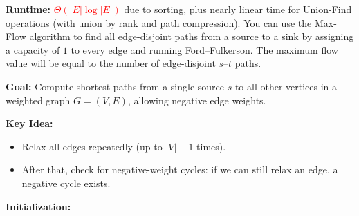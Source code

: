 \documentclass[a4paper,landscape]{article}
\newcommand{\timecomplexity}[1]{\textcolor{red}{#1}}
\begin{document}
\begin{multicols}{7}
\noindent %

\textbf{Runtime:} \timecomplexity{$\Theta(|E| \log |E|)$} due to sorting, plus nearly linear time for Union-Find operations (with union by rank and path compression).
\endtcolorbox
\tcolorbox[mybox={Edge Disjoint Paths using Max Flow}]
You can use the Max-Flow algorithm to find all edge-disjoint paths from a source to a sink by assigning a capacity of $1$ to every edge and running Ford–Fulkerson.  
The maximum flow value will be equal to the number of edge-disjoint $s$–$t$ paths.
\endtcolorbox


\tcolorbox[mybox={Bellman-Ford Algorithm}]
\textbf{Goal:} Compute shortest paths from a single source $s$ to all other vertices in a weighted graph $G = (V, E)$, allowing negative edge weights.

\textbf{Key Idea:}
\begin{itemize}[noitemsep, topsep=0pt]
    \item Relax all edges repeatedly (up to $|V| - 1$ times).
    \item After that, check for negative-weight cycles: if we can still relax an edge, a negative cycle exists.
\end{itemize}


\textbf{Initialization:}
\noindent %


\end{multicols}
\end{document}
